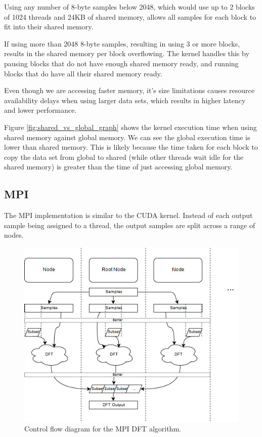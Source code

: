 \documentclass[11pt,a4paper]{article}
\begin{document}
Using any number of 8-byte samples below 2048, which would use up to 2 blocks of 1024 threads and 24KB of shared memory, allows all samples for each block to fit into their shared memory. 

If using more than 2048 8-byte samples, resulting in using 3 or more blocks, results in the shared memory per block overflowing. The kernel handles this by pausing blocks that do not have enough shared memory ready, and running blocks that do have all their shared memory ready.

Even though we are accessing faster memory, it's size limitations causes resource availability delays when using larger data sets, which results in higher latency and lower performance. 

Figure \ref{fig:shared_vs_global_graph} shows the kernel execution time when using shared memory against global memory. We can see the global execution time is lower than shared memory. This is likely because the time taken for each block to copy the data set from global to shared (while other threads wait idle for the shared memory) is greater than the time of just accessing global memory.

\subsection{MPI}
The MPI implementation is similar to the CUDA kernel. Instead of each output sample being assigned to a thread, the output samples are split across a range of nodes. 

\begin{figure}[H]
\begin{center}
\includegraphics[scale=0.7]{mpi_impl1}
\end{center}
\caption{Control flow diagram for the MPI DFT algorithm.}
\label{fig:train10x}
\end{figure}
\end{document}
